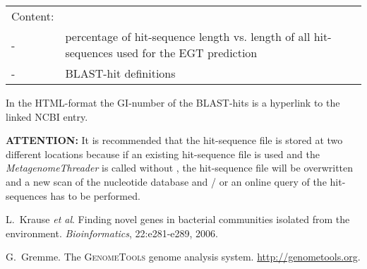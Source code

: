 \documentclass[12pt,titlepage]{article}
\newcommand{\MetagenomeThreader}{\textit{MetagenomeThreader}\xspace}
\newcommand{\Attention}{\textbf{ATTENTION:}\xspace}
\begin{document}
\begin{tabular}{p{}p{14cm}}
Content:
\\
- &percentage of hit-sequence length vs. length of all
hit-sequences used for the EGT prediction
\\
- &BLAST-hit definitions
\end{tabular}

In the HTML-format the GI-number of the BLAST-hits is a hyperlink to the
linked NCBI entry.

\Attention It is recommended that the hit-sequence file is stored at two
different locations because if an existing hit-sequence file is used and
the \MetagenomeThreader is called without  , the hit-sequence file
will be overwritten and a new scan of the nucleotide database and / or an online query of the
hit-sequences has to be performed.

%
%
\begin{thebibliography}{1}

L.~Krause \textit{et al}.
\newblock Finding novel genes in bacterial communities isolated
from the environment. \textit{Bioinformatics}, 22:e281-e289, 2006.

G.~Gremme.
\newblock The \textsc{GenomeTools} genome analysis system.
  \url{http://genometools.org}.

\end{thebibliography}
\end{document}
